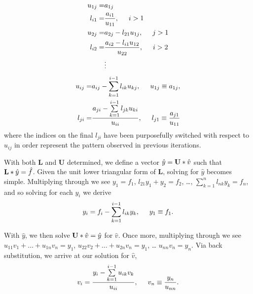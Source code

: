 \documentclass[11pt,a4paper]{article}
\begin{document}
\begin{align*}
u_{1j} =& a_{1j} \\
l_{i1} =& \frac{a_{i1}}{u_{11}}, \hspace{0.5 cm} i>1 \\
u_{2j} =& a_{2j} - l_{21}u_{1j}, \hspace{0.5 cm} j>1 \\
l_{i2} =& \frac{a_{i2} - l_{i1}u_{12}}{u_{22}}, \hspace{0.5 cm} i>2 \\
&\vdots \\
\end{align*}
\begin{align}
u_{ij} =& a_{ij} - \sum\limits_{k=1}^{i-1} l_{ik}u_{kj}, \hspace{0.5 cm} u_{1j} \equiv a_{1j},\\
l_{ji} =& \frac{a_{ji} - \sum\limits_{k=1}^{i-1} l_{jk}u_{ki}}{u_{ii}}, \hspace{0.5 cm} l_{j1} \equiv \frac{a_{j1}}{u_{11}}
\end{align}
where the indices on the final $l_{ji}$ have been purposefully switched with respect to $u_{ij}$ in order represent the pattern observed in previous iterations.

With both {\bf L} and {\bf U} determined, we define a vector $\hat{y} = {\bf U}*\hat{v}$ such that ${\bf L}*\hat{y} = \hat{f}$. Given the unit lower triangular form of {\bf L}, solving for $\hat{y}$ becomes simple. Multiplying through we see $y_1 = f_1$, \hspace{0.1 cm} $l_{21}y_1 + y_2 = f_2$, \hspace{0.1 cm} \dots, \hspace{0.1 cm} $\sum\limits_{k=1}^n l_{nk}y_k = f_n$, and so solving for each $y_{i}$ we derive 
\begin{equation}
y_{i} = f_{i} - \sum\limits_{k=1}^{i-1} l_{ik}y_k, \hspace{0.5 cm} y_1 \equiv f_1.
\end{equation}

With $\hat{y}$, we then solve ${\bf U}*\hat{v} = \hat{y}$ for $\hat{v}$. Once more, multiplying through we see $u_{11}v_1 + \dots + u_{1n}v_n = y_1$, \hspace{0.2 cm} $u_{22}v_2 + \dots + u_{2n}v_n = y_1$, \hspace{0.1 cm} \dots \hspace{0.1 cm} $u_{nn}v_n = y_n$. Via back substitution, we arrive at our solution for $\hat{v}$,
\begin{equation}
v_i = \frac{y_i - \sum\limits_{k=1}^{i-1} u_{ik}v_k}{u_{ii}}, \hspace{0.5 cm} v_n \equiv \frac{y_n}{u_{nn}}.
\end{equation}
\end{document}
